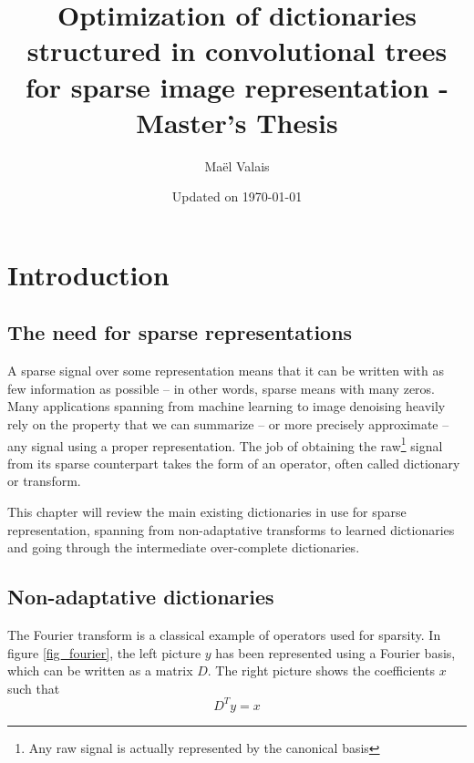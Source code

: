 


\author{Maël Valais}
\date{Updated on \today}
\title{Optimization of dictionaries structured in convolutional trees for sparse image representation - Master's Thesis}


\chapter{Introduction}

\section{The need for sparse representations}

A sparse signal over some representation means that it can be written with as few information as possible – in other words, sparse means with many zeros. Many applications spanning from machine learning to image denoising heavily rely on the property that we can summarize – or more precisely approximate – any signal using a proper representation. The job of obtaining the raw\footnote{Any raw signal is actually represented by the canonical basis} signal from its sparse counterpart takes the form of an operator, often called dictionary or transform.

This chapter will review the main existing dictionaries in use for sparse representation, spanning from non-adaptative transforms to learned dictionaries and going through the intermediate over-complete dictionaries.

\section{Non-adaptative dictionaries}

The Fourier transform is a classical example of operators used for sparsity. In figure \ref{fig_fourier}, the left picture $y$ has been represented using a Fourier basis, which can be written as a matrix $D$. The right picture shows the coefficients $x$ such that
$$D^Ty = x$$


